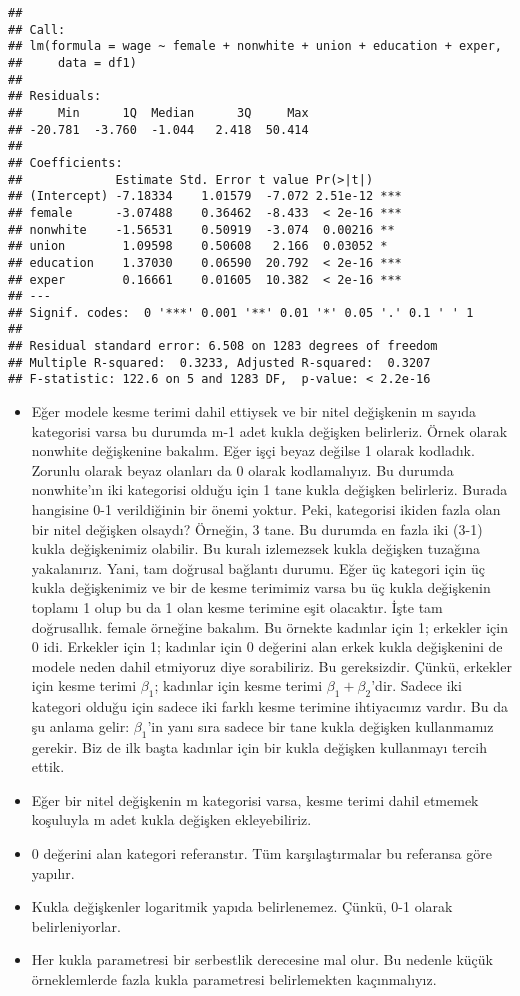 \documentclass[
]{book}
\begin{document}
\begin{verbatim}
## 
## Call:
## lm(formula = wage ~ female + nonwhite + union + education + exper, 
##     data = df1)
## 
## Residuals:
##     Min      1Q  Median      3Q     Max 
## -20.781  -3.760  -1.044   2.418  50.414 
## 
## Coefficients:
##             Estimate Std. Error t value Pr(>|t|)    
## (Intercept) -7.18334    1.01579  -7.072 2.51e-12 ***
## female      -3.07488    0.36462  -8.433  < 2e-16 ***
## nonwhite    -1.56531    0.50919  -3.074  0.00216 ** 
## union        1.09598    0.50608   2.166  0.03052 *  
## education    1.37030    0.06590  20.792  < 2e-16 ***
## exper        0.16661    0.01605  10.382  < 2e-16 ***
## ---
## Signif. codes:  0 '***' 0.001 '**' 0.01 '*' 0.05 '.' 0.1 ' ' 1
## 
## Residual standard error: 6.508 on 1283 degrees of freedom
## Multiple R-squared:  0.3233, Adjusted R-squared:  0.3207 
## F-statistic: 122.6 on 5 and 1283 DF,  p-value: < 2.2e-16
\end{verbatim}

\begin{itemize}
\item
  Eğer modele kesme terimi dahil ettiysek ve bir nitel değişkenin m sayıda kategorisi varsa bu durumda m-1 adet kukla değişken belirleriz. Örnek olarak nonwhite değişkenine bakalım. Eğer işçi beyaz değilse 1 olarak kodladık. Zorunlu olarak beyaz olanları da 0 olarak kodlamalıyız. Bu durumda nonwhite'ın iki kategorisi olduğu için 1 tane kukla değişken belirleriz. Burada hangisine 0-1 verildiğinin bir önemi yoktur. Peki, kategorisi ikiden fazla olan bir nitel değişken olsaydı? Örneğin, 3 tane. Bu durumda en fazla iki (3-1) kukla değişkenimiz olabilir. Bu kuralı izlemezsek kukla değişken tuzağına yakalanırız. Yani, tam doğrusal bağlantı durumu. Eğer üç kategori için üç kukla değişkenimiz ve bir de kesme terimimiz varsa bu üç kukla değişkenin toplamı 1 olup bu da 1 olan kesme terimine eşit olacaktır. İşte tam doğrusallık. female örneğine bakalım. Bu örnekte kadınlar için 1; erkekler için 0 idi. Erkekler için 1; kadınlar için 0 değerini alan erkek kukla değişkenini de modele neden dahil etmiyoruz diye sorabiliriz. Bu gereksizdir. Çünkü, erkekler için kesme terimi \(\beta_1\); kadınlar için kesme terimi \(\beta_1 + \beta_2\)'dir. Sadece iki kategori olduğu için sadece iki farklı kesme terimine ihtiyacımız vardır. Bu da şu anlama gelir: \(\beta_1\)'in yanı sıra sadece bir tane kukla değişken kullanmamız gerekir. Biz de ilk başta kadınlar için bir kukla değişken kullanmayı tercih ettik.
\item
  Eğer bir nitel değişkenin m kategorisi varsa, kesme terimi dahil etmemek koşuluyla m adet kukla değişken ekleyebiliriz.
\item
  0 değerini alan kategori referanstır. Tüm karşılaştırmalar bu referansa göre yapılır.
\item
  Kukla değişkenler logaritmik yapıda belirlenemez. Çünkü, 0-1 olarak belirleniyorlar.
\item
  Her kukla parametresi bir serbestlik derecesine mal olur. Bu nedenle küçük örneklemlerde fazla kukla parametresi belirlemekten kaçınmalıyız.
\end{itemize}
\end{document}

